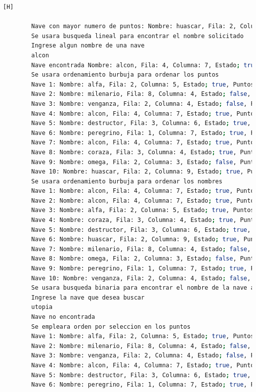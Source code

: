\documentclass{article}
\begin{document}
\begin{lstlisting}[language=bash,caption={Probando DemoBatalla.java }][H]
	    
	    Nave con mayor numero de puntos: Nombre: huascar, Fila: 2, Columna: 9, Estado; true, Puntos: 80
	    Se usara busqueda lineal para encontrar el nombre solicitado
	    Ingrese algun nombre de una nave
	    alcon
	    Nave encontrada Nombre: alcon, Fila: 4, Columna: 7, Estado; true, Puntos: 43
	    Se usara ordenamiento burbuja para ordenar los puntos
	    Nave 1: Nombre: alfa, Fila: 2, Columna: 5, Estado; true, Puntos: 15
	    Nave 2: Nombre: milenario, Fila: 8, Columna: 4, Estado; false, Puntos: 30
	    Nave 3: Nombre: venganza, Fila: 2, Columna: 4, Estado; false, Puntos: 32
	    Nave 4: Nombre: alcon, Fila: 4, Columna: 7, Estado; true, Puntos: 43
	    Nave 5: Nombre: destructor, Fila: 3, Columna: 6, Estado; true, Puntos: 47
	    Nave 6: Nombre: peregrino, Fila: 1, Columna: 7, Estado; true, Puntos: 49
	    Nave 7: Nombre: alcon, Fila: 4, Columna: 7, Estado; true, Puntos: 53
	    Nave 8: Nombre: coraza, Fila: 3, Columna: 4, Estado; true, Puntos: 54
	    Nave 9: Nombre: omega, Fila: 2, Columna: 3, Estado; false, Puntos: 56
	    Nave 10: Nombre: huascar, Fila: 2, Columna: 9, Estado; true, Puntos: 80
	    Se usara ordenamiento burbuja para ordenar los nombres
	    Nave 1: Nombre: alcon, Fila: 4, Columna: 7, Estado; true, Puntos: 43
	    Nave 2: Nombre: alcon, Fila: 4, Columna: 7, Estado; true, Puntos: 53
	    Nave 3: Nombre: alfa, Fila: 2, Columna: 5, Estado; true, Puntos: 15
	    Nave 4: Nombre: coraza, Fila: 3, Columna: 4, Estado; true, Puntos: 54
	    Nave 5: Nombre: destructor, Fila: 3, Columna: 6, Estado; true, Puntos: 47
	    Nave 6: Nombre: huascar, Fila: 2, Columna: 9, Estado; true, Puntos: 80
	    Nave 7: Nombre: milenario, Fila: 8, Columna: 4, Estado; false, Puntos: 30
	    Nave 8: Nombre: omega, Fila: 2, Columna: 3, Estado; false, Puntos: 56
	    Nave 9: Nombre: peregrino, Fila: 1, Columna: 7, Estado; true, Puntos: 49
	    Nave 10: Nombre: venganza, Fila: 2, Columna: 4, Estado; false, Puntos: 32
	    Se usara busqueda binaria para encontrar el nombre de la nave a buscar
	    Ingrese la nave que desea buscar
	    utopia
	    Nave no encontrada
	    Se empleara orden por seleccion en los puntos
	    Nave 1: Nombre: alfa, Fila: 2, Columna: 5, Estado; true, Puntos: 15
	    Nave 2: Nombre: milenario, Fila: 8, Columna: 4, Estado; false, Puntos: 30
	    Nave 3: Nombre: venganza, Fila: 2, Columna: 4, Estado; false, Puntos: 32
	    Nave 4: Nombre: alcon, Fila: 4, Columna: 7, Estado; true, Puntos: 43
	    Nave 5: Nombre: destructor, Fila: 3, Columna: 6, Estado; true, Puntos: 47
	    Nave 6: Nombre: peregrino, Fila: 1, Columna: 7, Estado; true, Puntos: 49

\end{lstlisting}
\end{document}
